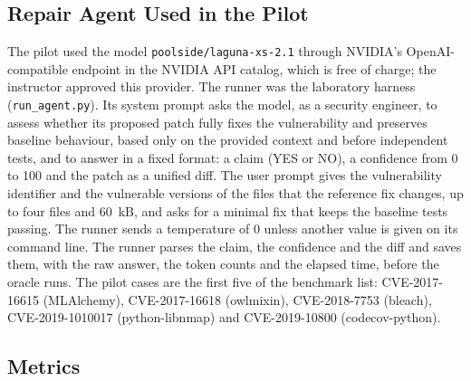 \documentclass[ai,article,submit,oneauthor]{Definitions/mdpi}
\begin{document}
\subsection{Repair Agent Used in the Pilot}

The pilot used the model \texttt{poolside/\allowbreak laguna-xs-2.1} through NVIDIA's OpenAI-compatible endpoint in the NVIDIA API catalog, which is free of charge; the instructor approved this provider. The runner was the laboratory harness (\texttt{run\_agent.py}). Its system prompt asks the model, as a security engineer, to assess whether its proposed patch fully fixes the vulnerability and preserves baseline behaviour, based only on the provided context and before independent tests, and to answer in a fixed format: a claim (YES or NO), a confidence from 0 to 100 and the patch as a unified diff. The user prompt gives the vulnerability identifier and the vulnerable versions of the files that the reference fix changes, up to four files and 60~kB, and asks for a minimal fix that keeps the baseline tests passing. The runner sends a temperature of 0 unless another value is given on its command line. The runner parses the claim, the confidence and the diff and saves them, with the raw answer, the token counts and the elapsed time, before the oracle runs. The pilot cases are the first five of the benchmark list: CVE-2017-16615 (MLAlchemy), CVE-2017-16618 (owlmixin), CVE-2018-7753 (bleach), CVE-2019-1010017 (python-libnmap) and CVE-2019-10800 (codecov-python).

\subsection{Metrics}\label{sec:metrics}
\end{document}
